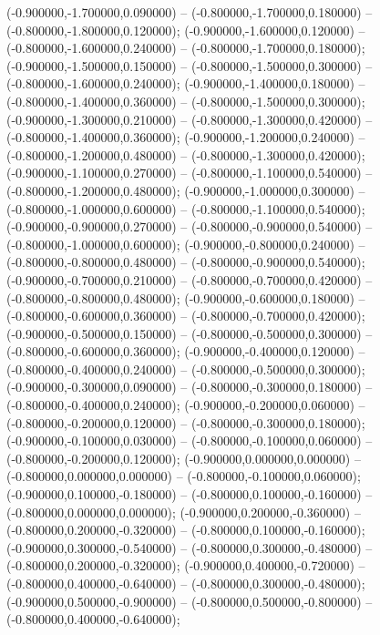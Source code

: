  (-0.900000,-1.700000,0.090000) -- (-0.800000,-1.700000,0.180000) -- (-0.800000,-1.800000,0.120000);
 (-0.900000,-1.600000,0.120000) -- (-0.800000,-1.600000,0.240000) -- (-0.800000,-1.700000,0.180000);
 (-0.900000,-1.500000,0.150000) -- (-0.800000,-1.500000,0.300000) -- (-0.800000,-1.600000,0.240000);
 (-0.900000,-1.400000,0.180000) -- (-0.800000,-1.400000,0.360000) -- (-0.800000,-1.500000,0.300000);
 (-0.900000,-1.300000,0.210000) -- (-0.800000,-1.300000,0.420000) -- (-0.800000,-1.400000,0.360000);
 (-0.900000,-1.200000,0.240000) -- (-0.800000,-1.200000,0.480000) -- (-0.800000,-1.300000,0.420000);
 (-0.900000,-1.100000,0.270000) -- (-0.800000,-1.100000,0.540000) -- (-0.800000,-1.200000,0.480000);
 (-0.900000,-1.000000,0.300000) -- (-0.800000,-1.000000,0.600000) -- (-0.800000,-1.100000,0.540000);
 (-0.900000,-0.900000,0.270000) -- (-0.800000,-0.900000,0.540000) -- (-0.800000,-1.000000,0.600000);
 (-0.900000,-0.800000,0.240000) -- (-0.800000,-0.800000,0.480000) -- (-0.800000,-0.900000,0.540000);
 (-0.900000,-0.700000,0.210000) -- (-0.800000,-0.700000,0.420000) -- (-0.800000,-0.800000,0.480000);
 (-0.900000,-0.600000,0.180000) -- (-0.800000,-0.600000,0.360000) -- (-0.800000,-0.700000,0.420000);
 (-0.900000,-0.500000,0.150000) -- (-0.800000,-0.500000,0.300000) -- (-0.800000,-0.600000,0.360000);
 (-0.900000,-0.400000,0.120000) -- (-0.800000,-0.400000,0.240000) -- (-0.800000,-0.500000,0.300000);
 (-0.900000,-0.300000,0.090000) -- (-0.800000,-0.300000,0.180000) -- (-0.800000,-0.400000,0.240000);
 (-0.900000,-0.200000,0.060000) -- (-0.800000,-0.200000,0.120000) -- (-0.800000,-0.300000,0.180000);
 (-0.900000,-0.100000,0.030000) -- (-0.800000,-0.100000,0.060000) -- (-0.800000,-0.200000,0.120000);
 (-0.900000,0.000000,0.000000) -- (-0.800000,0.000000,0.000000) -- (-0.800000,-0.100000,0.060000);
 (-0.900000,0.100000,-0.180000) -- (-0.800000,0.100000,-0.160000) -- (-0.800000,0.000000,0.000000);
 (-0.900000,0.200000,-0.360000) -- (-0.800000,0.200000,-0.320000) -- (-0.800000,0.100000,-0.160000);
 (-0.900000,0.300000,-0.540000) -- (-0.800000,0.300000,-0.480000) -- (-0.800000,0.200000,-0.320000);
 (-0.900000,0.400000,-0.720000) -- (-0.800000,0.400000,-0.640000) -- (-0.800000,0.300000,-0.480000);
 (-0.900000,0.500000,-0.900000) -- (-0.800000,0.500000,-0.800000) -- (-0.800000,0.400000,-0.640000);
